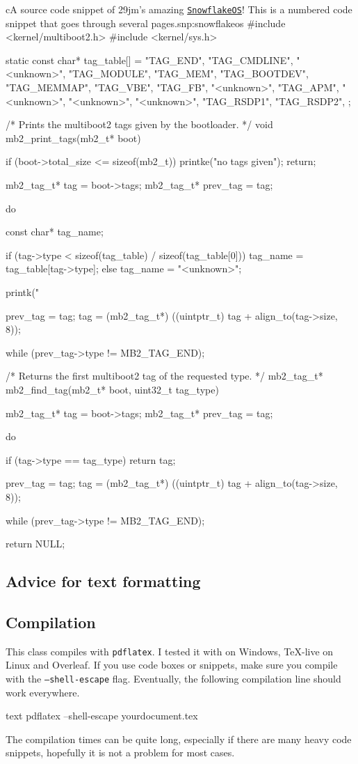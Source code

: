 \documentclass[raggedright, twoside, 11pt]{tufte-style-article}
\begin{document}
\begin{snippetnum}{c}{A source code snippet of 29jm's amazing \href{https://github.com/29jm/SnowflakeOS}{\texttt{SnowflakeOS}}! This is a numbered code snippet that goes through several pages.}{snp:snowflakeos}
#include <kernel/multiboot2.h>
#include <kernel/sys.h>

static const char* tag_table[] = {
	"TAG_END",
	"TAG_CMDLINE",
	"<unknown>",
	"TAG_MODULE",
	"TAG_MEM",
	"TAG_BOOTDEV",
	"TAG_MEMMAP",
	"TAG_VBE",
	"TAG_FB",
	"<unknown>",
	"TAG_APM",
	"<unknown>",
	"<unknown>",
	"<unknown>",
	"TAG_RSDP1",
	"TAG_RSDP2",
};

/* Prints the multiboot2 tags given by the bootloader.
*/
void mb2_print_tags(mb2_t* boot) {
	if (boot->total_size <= sizeof(mb2_t)) {
		printke("no tags given");
		return;
	}
	
	mb2_tag_t* tag = boot->tags;
	mb2_tag_t* prev_tag = tag;
	
	do {
		const char* tag_name;
		
		if (tag->type < sizeof(tag_table) / sizeof(tag_table[0])) {
			tag_name = tag_table[tag->type];
		} else {
			tag_name = "<unknown>";
		}
		
		printk("%
		
		prev_tag = tag;
		tag = (mb2_tag_t*) ((uintptr_t) tag + align_to(tag->size, 8));
	} while (prev_tag->type != MB2_TAG_END);
}

/* Returns the first multiboot2 tag of the requested type.
*/
mb2_tag_t* mb2_find_tag(mb2_t* boot, uint32_t tag_type) {
	mb2_tag_t* tag = boot->tags;
	mb2_tag_t* prev_tag = tag;
	
	do {
		if (tag->type == tag_type) {
			return tag;
		}
		
		prev_tag = tag;
		tag = (mb2_tag_t*) ((uintptr_t) tag + align_to(tag->size, 8));
	} while (prev_tag->type != MB2_TAG_END);
	
	return NULL;
}
\end{snippetnum}

\subsection{Advice for text formatting}

\subsection{Compilation}

This class compiles with \texttt{pdflatex}. I tested it with  on Windows, \TeX-live on Linux and Overleaf. If you use code boxes or snippets, make sure you compile with the \texttt{--shell-escape} flag. Eventually, the following compilation line should work everywhere.
\begin{codebox}{text}
pdflatex --shell-escape yourdocument.tex
\end{codebox}
The compilation times can be quite long, especially if there are many heavy code snippets, hopefully it is not a problem for most cases.
\end{document}
